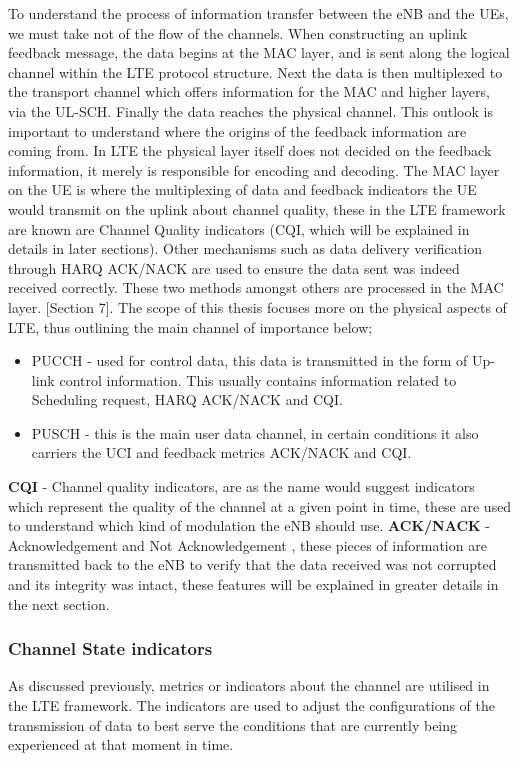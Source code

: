 \documentclass{article}
\begin{document}
To understand the process of information transfer between the eNB and the UEs, we must take not of the flow of the channels. When constructing an uplink feedback message, the data begins at the MAC layer, and is sent along the logical channel within the LTE protocol structure. Next the data is then multiplexed to the transport channel which offers information for the MAC and higher layers, via the UL-SCH. Finally the data reaches the physical channel. This outlook is important to understand where the origins of the feedback information are coming from. In LTE the physical layer itself does not decided on the feedback information, it merely is responsible for encoding and decoding. The MAC layer on the UE is where the multiplexing of data and feedback indicators the UE would transmit on the uplink about channel quality, these in the LTE framework are known are Channel Quality indicators (CQI, which will be explained in details in later sections). Other mechanisms such as data delivery verification through HARQ ACK/NACK are used to ensure the data sent was indeed received correctly. These two methods amongst others are processed in the MAC layer. \cite{3gpp25319}[Section 7]. The scope of this thesis focuses more on the physical aspects of LTE, thus outlining the main channel of importance below;
\begin{itemize}
    \item PUCCH - used for control data, this data is transmitted in the form of Up-link control information. This usually contains information related to Scheduling request, HARQ ACK/NACK and CQI. 
    \item PUSCH - this is the main user data channel, in certain conditions it also carriers the UCI and feedback metrics ACK/NACK and CQI.
\end{itemize}
\textbf{CQI} - Channel quality indicators, are as the name would suggest indicators which represent the quality of the channel at a given point in time, these are used to understand which kind of modulation the eNB should use. \newline
\textbf{ACK/NACK} - Acknowledgement and Not Acknowledgement , these pieces of information are transmitted back to the eNB to verify that the data received was not corrupted and its integrity was intact, these features will be explained in greater details in the next section.

\subsubsection{Channel State indicators}
As discussed previously, metrics or indicators about the channel are utilised in the LTE framework. The indicators are used to adjust the configurations of the transmission of data to best serve the conditions that are currently being experienced at that moment in time. 
\end{document}
